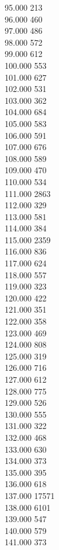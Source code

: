 { 95.000	213 \\
 96.000	460 \\
 97.000	486 \\
 98.000	572 \\
 99.000	612 \\
 100.000	553 \\
 101.000	627 \\
 102.000	531 \\
 103.000	362 \\
 104.000	684 \\
 105.000	583 \\
 106.000	591 \\
 107.000	676 \\
 108.000	589 \\
 109.000	470 \\
 110.000	534 \\
 111.000	2863 \\
 112.000	329 \\
 113.000	581 \\
 114.000	384 \\
 115.000	2359 \\
 116.000	836 \\
 117.000	624 \\
 118.000	557 \\
 119.000	323 \\
 120.000	422 \\
 121.000	351 \\
 122.000	358 \\
 123.000	469 \\
 124.000	808 \\
 125.000	319 \\
 126.000	716 \\
 127.000	612 \\
 128.000	775 \\
 129.000	526 \\
 130.000	555 \\
 131.000	322 \\
 132.000	468 \\
 133.000	630 \\
 134.000	373 \\
 135.000	395 \\
 136.000	618 \\
 137.000	17571 \\
 138.000	6101 \\
 139.000	547 \\
 140.000	579 \\
 141.000	373 \\
}
